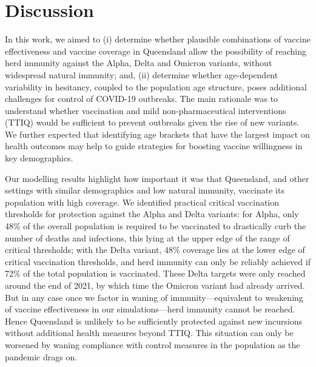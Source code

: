 \documentclass[article, a4, authoryear]{elsarticle}
\begin{document}
\section{Discussion}
\label{sec:discussion}

In this work, we aimed to (i) determine whether plausible combinations of vaccine effectiveness and vaccine coverage in Queensland allow the possibility of reaching herd immunity against the Alpha, Delta and Omicron variants, without widespread natural immunity; and, (ii) determine whether age-dependent variability in hesitancy, coupled to the population age structure, poses additional challenges for control of COVID-19 outbreaks. The main rationale was to understand whether vaccination and mild non-pharmaceutical interventions (TTIQ) would be sufficient to prevent outbreaks given the rise of new variants. We further expected that identifying age brackets that have the largest impact on health outcomes may help to guide strategies for boosting vaccine willingness in key demographics.

Our modelling results highlight how important it was that Queensland, and other settings with similar demographics and low natural immunity, vaccinate its population with high coverage. We identified practical critical vaccination thresholds for protection against the Alpha and Delta variants: for Alpha, only 48\% of the overall population is required to be vaccinated to drastically curb the number of deaths and infections, this lying at the upper edge of the range of critical thresholds; with the Delta variant, 48\% coverage lies at the lower edge of critical vaccination thresholds, and herd immunity can only be reliably achieved if 72\% of the total population is vaccinated. These Delta targets were only reached around the end of 2021, by which time the Omicron variant had already arrived. But in any case once we factor in waning of immunity---equivalent to weakening of vaccine effectiveness in our simulations---herd immunity cannot be reached. Hence Queensland is unlikely to be sufficiently protected against new incursions without additional health measures beyond TTIQ. This situation can only be worsened by waning compliance with control measures in the population as the pandemic drags on.
\end{document}
